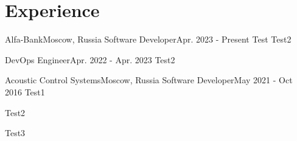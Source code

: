 

\section{Experience}\label{sec:experience}
\resumeSubHeadingListStart

\resumeSubheading
{Alfa-Bank}{Moscow, Russia}
    {Software Developer}{Apr. 2023 - Present}
    \resumeItemListStart
        {Test}
        {Test2}
    \resumeItemListEnd

    \resumeSubSubheading
    {DevOps Engineer}{Apr. 2022 - Apr. 2023}
    \resumeItemListStart
        {Test2}
    \resumeItemListEnd

\resumeSubheading
{Acoustic Control Systems}{Moscow, Russia}
    {Software Developer}{May 2021 - Oct 2016}
    \resumeItemListStart
        {Test1}

        {Test2}

        {Test3}
    \resumeItemListEnd

\resumeSubHeadingListEnd